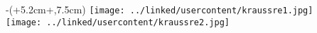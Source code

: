 \begin{textblock*}{\textwidth-4.5cm-\columnsep}(\border+5.2cm+\columnsep,7.5cm)
\noindent
\texttt{[image: ../linked/usercontent/kraussre1.jpg]} \\
\texttt{[image: ../linked/usercontent/kraussre2.jpg]} \\
\end{textblock*}
\vspace*{17.2cm}
